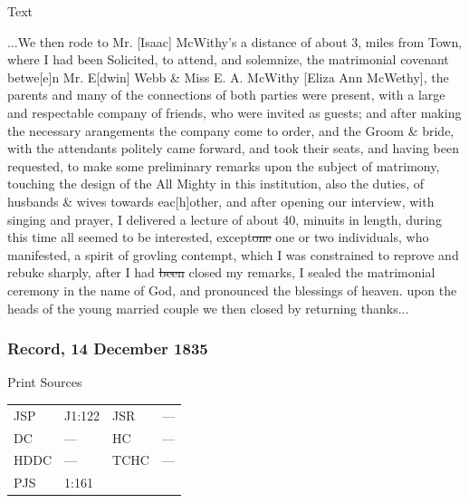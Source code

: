 			\begin{description}
				\item[Text]
			\end{description}
			
				...We then rode to Mr. [Isaac] McWithy's a distance of about 3, miles from Town, where I had been Solicited, to attend, and solemnize, the matrimonial covenant betwe[e]n Mr. E[dwin] Webb \& Miss E. A. McWithy [Eliza Ann McWethy], the parents and many of the connections of both parties were present, with a large and respectable company of friends, who were invited as guests; and after making the necessary arangements the company come to order, and the Groom \& bride, with the attendants politely came forward, and took their seats, and having been requested, to make some preliminary remarks upon the subject of matrimony, touching the design of the All Mighty in this institution, also the duties, of husbands \& wives towards eac[h]other, and after opening our interview, with singing and prayer, I delivered a lecture of about 40, minuits in length, during this time all seemed to be interested, except\sout{one} one or two individuals, who manifested, a spirit of grovling contempt, which I was constrained to reprove and rebuke sharply, after I had \sout{been} closed my remarks, I sealed the matrimonial ceremony in the name of God, and pronounced the blessings of heaven. upon the heads of the young married couple we then closed by returning thanks...
				
		\subsubsection{Record, 14 December 1835}
			\label{EMS-1835-JS-14-DEC-1835}
			
			\begin{description}
				\item[Print Sources]
			\end{description}

				\begin{tabular}{p{0.5in}p{1in}p{0.5in}p{1in}}
				JSP	 	& J1:122		& JSR 		& --- \\
				DC	 	& --- 				& HC 		& --- \\
				HDDC 	& ---				& TCHC 		& --- \\
				PJS 	& 1:161			& 	 		&  \\
				\end{tabular}
			
